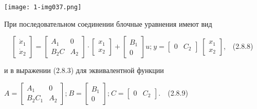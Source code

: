 \documentclass[a4paper]{article}
\begin{document}
{\centering  \texttt{[image: 1-img037.png]} \par}

\bigskip

{\centering\begin{russian}\sffamily
При последовательном соединении блочные уравнения имеют вид
\end{russian}\par}

{\begin{russian}\sffamily
\ \  $\left[\begin{matrix}\dot x_1\\\dot
x_2\end{matrix}\right]=\left[\begin{matrix}A_1&0\\B_2C&A_2\end{matrix}\right]\cdot
\left[\begin{matrix}x_1\\x_2\end{matrix}\right]+\left[\begin{matrix}B_1\\0\end{matrix}\right]u;_{}^{}y=\left[\begin{matrix}0&C_2\end{matrix}\right]\;\left[\begin{matrix}x_1\\x_2\end{matrix}\right]$,\ \ (2.8.8)
\end{russian}}

{\begin{russian}\sffamily
и в выражении (2.8.3) для эквивалентной функции
\end{russian}}


\bigskip

{\begin{russian}\sffamily

$A=\left[\begin{matrix}A_1&0\\B_2C_1&A_2\end{matrix}\right];_{}^{}B=\left[\begin{matrix}B_1\\0\end{matrix}\right];_{}^{}C=\left[\begin{matrix}0&C_2\end{matrix}\right]$.\ \ (2.8.9)
\end{russian}}
\end{document}
